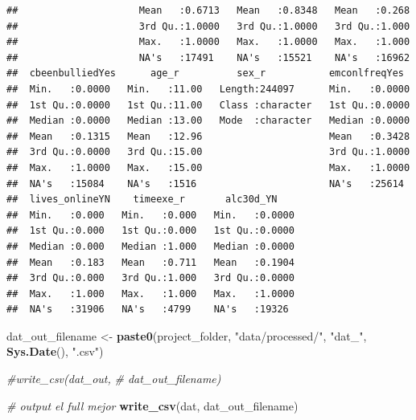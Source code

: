 \documentclass[
]{article}
\newenvironment{Shaded}{\begin{snugshade}}{\end{snugshade}}
\newcommand{\CommentTok}[1]{\textcolor[rgb]{0.56,0.35,0.01}{\textit{#1}}}
\newcommand{\FunctionTok}[1]{\textcolor[rgb]{0.13,0.29,0.53}{\textbf{#1}}}
\newcommand{\NormalTok}[1]{#1}
\newcommand{\OtherTok}[1]{\textcolor[rgb]{0.56,0.35,0.01}{#1}}
\newcommand{\StringTok}[1]{\textcolor[rgb]{0.31,0.60,0.02}{#1}}
\begin{document}
\begin{verbatim}
##                     Mean   :0.6713   Mean   :0.8348   Mean   :0.268  
##                     3rd Qu.:1.0000   3rd Qu.:1.0000   3rd Qu.:1.000  
##                     Max.   :1.0000   Max.   :1.0000   Max.   :1.000  
##                     NA's   :17491    NA's   :15521    NA's   :16962  
##  cbeenbulliedYes      age_r          sex_r           emconlfreqYes   
##  Min.   :0.0000   Min.   :11.00   Length:244097      Min.   :0.0000  
##  1st Qu.:0.0000   1st Qu.:11.00   Class :character   1st Qu.:0.0000  
##  Median :0.0000   Median :13.00   Mode  :character   Median :0.0000  
##  Mean   :0.1315   Mean   :12.96                      Mean   :0.3428  
##  3rd Qu.:0.0000   3rd Qu.:15.00                      3rd Qu.:1.0000  
##  Max.   :1.0000   Max.   :15.00                      Max.   :1.0000  
##  NA's   :15084    NA's   :1516                       NA's   :25614   
##  lives_onlineYN    timeexe_r       alc30d_YN     
##  Min.   :0.000   Min.   :0.000   Min.   :0.0000  
##  1st Qu.:0.000   1st Qu.:0.000   1st Qu.:0.0000  
##  Median :0.000   Median :1.000   Median :0.0000  
##  Mean   :0.183   Mean   :0.711   Mean   :0.1904  
##  3rd Qu.:0.000   3rd Qu.:1.000   3rd Qu.:0.0000  
##  Max.   :1.000   Max.   :1.000   Max.   :1.0000  
##  NA's   :31906   NA's   :4799    NA's   :19326
\end{verbatim}

\begin{Shaded}
\begin{Highlighting}[]
\NormalTok{dat\_out\_filename }\OtherTok{\textless{}{-}} \FunctionTok{paste0}\NormalTok{(project\_folder,}
                           \StringTok{"data/processed/"}\NormalTok{,}
                           \StringTok{"dat\_"}\NormalTok{, }\FunctionTok{Sys.Date}\NormalTok{(), }\StringTok{".csv"}\NormalTok{)}

\CommentTok{\#write\_csv(dat\_out,}
 \CommentTok{\#         dat\_out\_filename)}

\CommentTok{\# output el full mejor}
\FunctionTok{write\_csv}\NormalTok{(dat,}
\NormalTok{          dat\_out\_filename)}
\end{Highlighting}
\end{Shaded}
\end{document}
